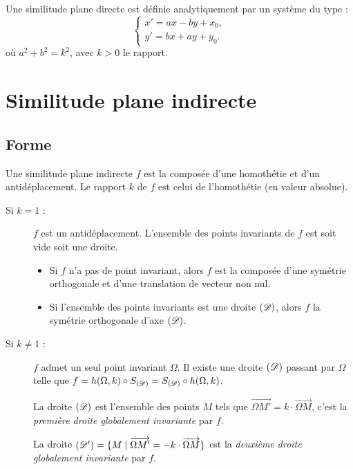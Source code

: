 	            Une similitude plane directe est d\'efinie analytiquement par un syst\`eme du type :
	            \[
	                  \left\lbrace
	                  \begin{array}{l}
	                        x' = a x - b y + x_0, \\
	                        y' = b x + a y + y_0.
	                  \end{array}
	                  \right.
	            \]
	            o\`u $a^2 + b^2 = k^2$, avec $k > 0$ le rapport.
      \section{Similitude plane indirecte}
      \subsection{Forme}
      Une similitude plane indirecte $f$ est la compos\'ee d'une homoth\'etie et d'un antid\'eplacement.
      Le rapport $k$ de $f$ est celui de l'homoth\'etie (en valeur absolue).
      \begin{description}
            \item[Si $k=1$ :] $f$ est un antid\'eplacement.
                  L'ensemble des points invariants de $f$ est soit vide soit une droite.
                  \begin{itemize}
                        \item Si $f$ n'a pas de point invariant, alors $f$ est la compos\'ee d'une sym\'etrie
                              orthogonale et d'une translation de vecteur non nul.
                        \item Si l'ensemble des points invariants est une droite $(\mathscr{D})$, alors 
                              $f$ la sym\'etrie orthogonale d'axe $(\mathscr{D})$.
                  \end{itemize}
            \item[Si $k\neq 1$ :] $f$ admet un seul point invariant $\Omega$.
                  Il existe une droite $(\mathscr{D})$ passant par $\Omega$ telle que 
                  $f = h(\Omega,k) \circ S_{(\mathscr{D})} = S_{(\mathscr{D})} \circ h(\Omega,k)$.
                  
                  La droite $(\mathscr{D})$ est l'ensemble des points $M$ tels que 
                  $\overrightarrow{\Omega M'} = k \cdot \overrightarrow{\Omega M}$,
                  c'est la \emph{premi\`ere droite globalement invariante} par $f$.
                  
                  La droite $(\mathscr{D}') = \{ M \mid \overrightarrow{\Omega M'} = -k \cdot \overrightarrow{\Omega M} \}$
                  est la \emph{deuxi\`eme droite globalement invariante} par $f$.
      \end{description}
